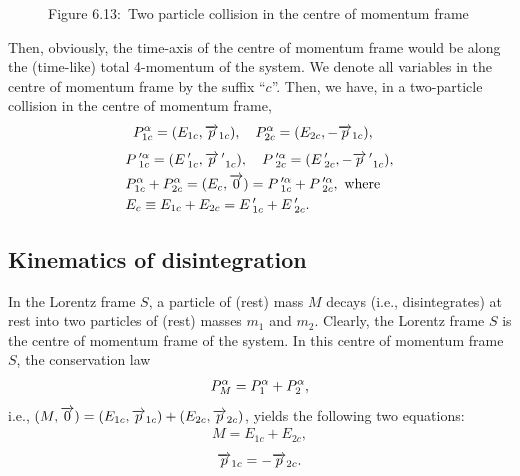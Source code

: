 \begin{figure}[H]
\begin{center}
\caption*{Figure 6.13:~Two particle collision in the 
centre of momentum frame} \label{fig6.13}
\end{center} 
\end{figure}
Then, obviously,  the time-axis of the centre of 
momentum 
frame would be along the (time-like) total 4-momentum 
of the 
system. We denote all variables in the centre of 
momentum 
frame by the suffix ``$c$''. Then, we have,  in a 
two-particle collision  in the centre of momentum 
frame,
\begin{align*}
&P^{{\alpha}}_{1c}=(E_{1c}, \overrightarrow{p}_{1c}),\quad 
P^{{\alpha}}_{2c}=(E_{2c},
-\overrightarrow{p}_{1c}),
\end{align*}
\begin{align*}
 &{P}\,'^{{\alpha}}_{1c}=({E}\,'_{1c},
{\overrightarrow{p}\,'}_{1c}),\quad 
{P}\,'^{{\alpha}}_{2c}=({E}\,'_{2c},
-{\overrightarrow{p}\,'}_{1c}),\\
&P^{{\alpha}}_{1c}+P^{{\alpha}}_{2c}
=(E_c, \overrightarrow{0})={P}\,'^{{\alpha}}_{1c}+{P}\,'^{{\alpha}}_{2c},  
\text{ where } \\
& E_c \equiv E_{1c}+E_{2c}={E}\,'_{1c}+{E}\,'_{2c}.
\end{align*}

\subsection{Kinematics of disintegration}
In the Lorentz frame $S$, a particle of (rest) mass 
$M$ 
decays (i.e., disintegrates) {at rest} into two 
particles 
of 
(rest) masses $m_1$ and $m_2$. Clearly, the Lorentz 
frame 
$S$ is the centre of momentum frame of the system. In 
this 
centre of momentum frame $S$, the conservation law 
\begin{align}\label{pm57}
 P^{{\alpha}}_M = P^{{\alpha}}_1 + P^{{\alpha}}_2,
\end{align}
i.e., $ (M,\overrightarrow{0})=(E_{1c},\overrightarrow{p}_{1c}) 
+(E_{2c},\overrightarrow{p}_{2c}) $, yields the following two 
equations:
\begin{align}\label{pm58}
M=E_{1c}+E_{2c},
\end{align}
\begin{align}\label{pm59}
\overrightarrow{p}_{1c}=-\overrightarrow{p}_{2c}.
\end{align}


